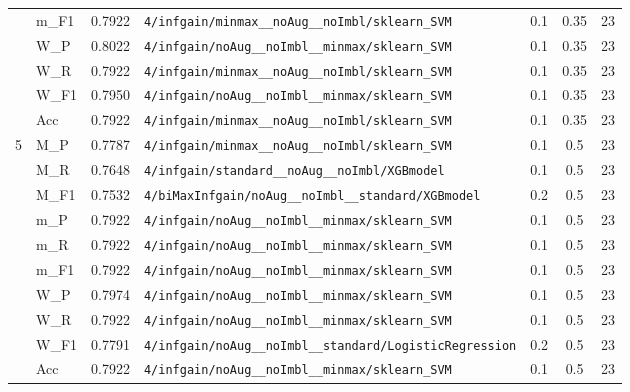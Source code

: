 \begin{table}[htbp]
\begin{tabular}{|c|l|c|>{\ttfamily\footnotesize}p{7.2cm}|c|c|c|}
 & m\_F1 & 0.7922 & \texttt{4/infgain/minmax\_\_noAug\_\_noImbl/sklearn\_SVM} & 0.1 & 0.35  & 23 \\ 
 & W\_P & 0.8022 & \texttt{4/infgain/noAug\_\_noImbl\_\_minmax/sklearn\_SVM} & 0.1 & 0.35  & 23 \\ 
 & W\_R & 0.7922 & \texttt{4/infgain/minmax\_\_noAug\_\_noImbl/sklearn\_SVM} & 0.1 & 0.35  & 23 \\ 
 & W\_F1 & 0.7950 & \texttt{4/infgain/noAug\_\_noImbl\_\_minmax/sklearn\_SVM} & 0.1 & 0.35  & 23 \\ 
 & Acc & 0.7922 & \texttt{4/infgain/minmax\_\_noAug\_\_noImbl/sklearn\_SVM} & 0.1 & 0.35  & 23 \\ 
\hline
\multirow{10}{*}{5} & M\_P & 0.7787 & \texttt{4/infgain/minmax\_\_noAug\_\_noImbl/sklearn\_SVM} & 0.1 & 0.5  & 23 \\ 
 & M\_R & 0.7648 & \texttt{4/infgain/standard\_\_noAug\_\_noImbl/XGBmodel} & 0.1 & 0.5  & 23 \\ 
 & M\_F1 & 0.7532 & \texttt{4/biMaxInfgain/noAug\_\_noImbl\_\_standard/XGBmodel} & 0.2 & 0.5  & 23 \\ 
 & m\_P & 0.7922 & \texttt{4/infgain/noAug\_\_noImbl\_\_minmax/sklearn\_SVM} & 0.1 & 0.5  & 23 \\ 
 & m\_R & 0.7922 & \texttt{4/infgain/noAug\_\_noImbl\_\_minmax/sklearn\_SVM} & 0.1 & 0.5  & 23 \\ 
 & m\_F1 & 0.7922 & \texttt{4/infgain/noAug\_\_noImbl\_\_minmax/sklearn\_SVM} & 0.1 & 0.5  & 23 \\ 
 & W\_P & 0.7974 & \texttt{4/infgain/noAug\_\_noImbl\_\_minmax/sklearn\_SVM} & 0.1 & 0.5  & 23 \\ 
 & W\_R & 0.7922 & \texttt{4/infgain/noAug\_\_noImbl\_\_minmax/sklearn\_SVM} & 0.1 & 0.5  & 23 \\ 
 & W\_F1 & 0.7791 & \texttt{4/infgain/noAug\_\_noImbl\_\_standard/LogisticRegression} & 0.2 & 0.5  & 23 \\ 
 & Acc & 0.7922 & \texttt{4/infgain/noAug\_\_noImbl\_\_minmax/sklearn\_SVM} & 0.1 & 0.5  & 23 \\ 
\hline
\end{tabular}
\end{table}